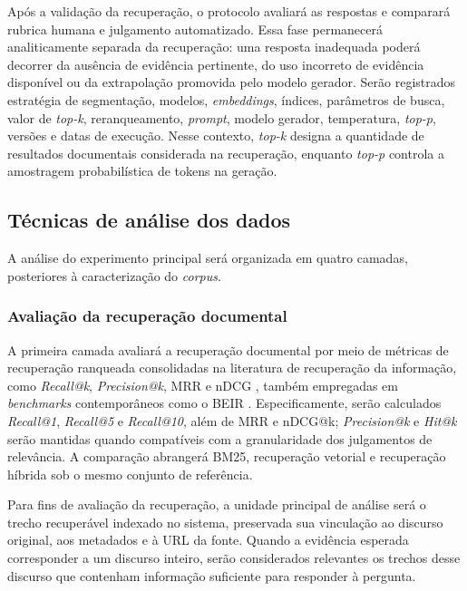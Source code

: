 Após a validação da recuperação, o protocolo avaliará as respostas e comparará rubrica humana e julgamento automatizado. Essa fase permanecerá analiticamente separada da recuperação: uma resposta inadequada poderá decorrer da ausência de evidência pertinente, do uso incorreto de evidência disponível ou da extrapolação promovida pelo modelo gerador. Serão registrados estratégia de segmentação, modelos, \textit{embeddings}, índices, parâmetros de busca, valor de \textit{top-k}, reranqueamento, \textit{prompt}, modelo gerador, temperatura, \textit{top-p}, versões e datas de execução. Nesse contexto, \textit{top-k} designa a quantidade de resultados documentais considerada na recuperação, enquanto \textit{top-p} controla a amostragem probabilística de tokens na geração.

\subsection{Técnicas de análise dos dados}

\label{sec:analise}

A análise do experimento principal será organizada em quatro camadas, posteriores à caracterização do \textit{corpus}. 

\subsubsection{Avaliação da recuperação documental}
\label{sec:metricas}

A primeira camada avaliará a recuperação documental por meio de métricas de recuperação ranqueada consolidadas na literatura de recuperação da informação, como \textit{Recall@k}, \textit{Precision@k}, MRR e nDCG \parencite{manningEtAl2008informationRetrieval}, também empregadas em \textit{benchmarks} contemporâneos como o BEIR \parencite{thakurEtAl2021beir}. Especificamente, serão calculados \textit{Recall@1}, \textit{Recall@5} e \textit{Recall@10}, além de MRR e nDCG@k; \textit{Precision@k} e \textit{Hit@k} serão mantidas quando compatíveis com a granularidade dos julgamentos de relevância. A comparação abrangerá BM25, recuperação vetorial e recuperação híbrida sob o mesmo conjunto de referência.

Para fins de avaliação da recuperação, a unidade principal de análise será o trecho recuperável indexado no sistema, preservada sua vinculação ao discurso original, aos metadados e à URL da fonte. Quando a evidência esperada corresponder a um discurso inteiro, serão considerados relevantes os trechos desse discurso que contenham informação suficiente para responder à pergunta.

